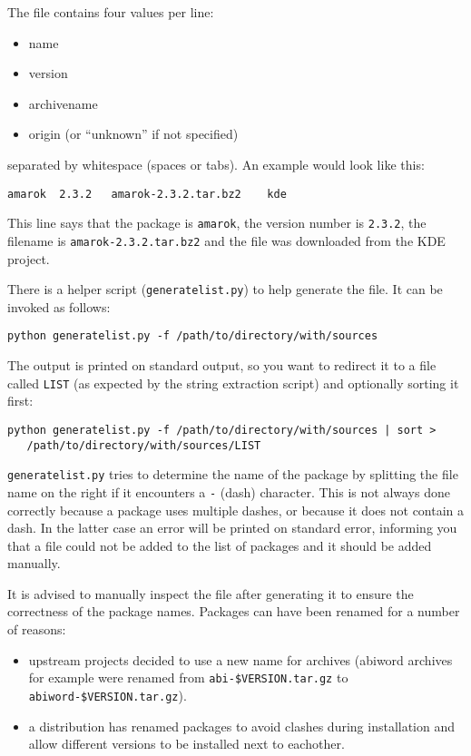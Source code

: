 \documentclass[10pt]{article}
\begin{document}
The file contains four values per line:

\begin{itemize}
\item name
\item version
\item archivename
\item origin (or ``unknown'' if not specified)
\end{itemize}

separated by whitespace (spaces or tabs). An example would look like this:

\begin{verbatim}
amarok	2.3.2	amarok-2.3.2.tar.bz2	kde
\end{verbatim}

This line says that the package is \texttt{amarok}, the version number is
\texttt{2.3.2}, the filename is \texttt{amarok-2.3.2.tar.bz2} and the file
was downloaded from the KDE project.

There is a helper script (\texttt{generatelist.py}) to help generate the file.
It can be invoked as follows:

\begin{verbatim}
python generatelist.py -f /path/to/directory/with/sources
\end{verbatim}

The output is printed on standard output, so you want to redirect it to a file
called \texttt{LIST} (as expected by the string extraction script) and
optionally sorting it first:

\begin{verbatim}
python generatelist.py -f /path/to/directory/with/sources | sort >
   /path/to/directory/with/sources/LIST
\end{verbatim}


\texttt{generatelist.py} tries to determine the name of the package by
splitting the file name on the right if it encounters a \texttt{-} (dash)
character. This is not always done correctly because a package uses multiple
dashes, or because it does not contain a dash. In the latter case an error
will be printed on standard error, informing you that a file could not be
added to the list of packages and it should be added manually.

It is advised to manually inspect the file after generating it to ensure the
correctness of the package names. Packages can have been renamed for a number
of reasons:

\begin{itemize}
\item upstream projects decided to use a new name for archives (abiword
archives for example were renamed from \texttt{abi-\$VERSION.tar.gz} to
\texttt{abiword-\$VERSION.tar.gz}).
\item a distribution has renamed packages to avoid clashes during installation
and allow different versions to be installed next to eachother.
\end{itemize}
\end{document}
